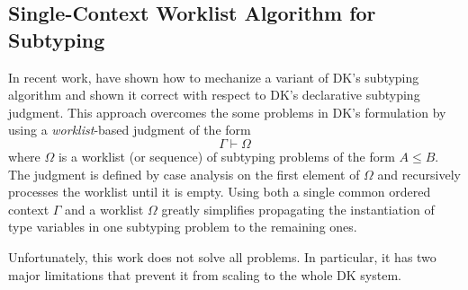 % 
% 
% 
\subsection{Single-Context Worklist Algorithm for Subtyping}

In recent work, \citet{itp2018} have shown how to mechanize a variant of DK's
subtyping algorithm and shown it correct with respect to DK's declarative
subtyping judgment. This approach overcomes the some problems in DK's formulation
by using a \emph{worklist}-based judgment of the form $$\Gamma \vdash \Omega$$
where $\Omega$ is a worklist (or sequence) of subtyping problems of the
form $A \leq B$.  The judgment is defined by case analysis on the first
element of $\Omega$ and recursively processes the worklist until it is empty.
Using both a single common ordered context $\Gamma$ and a worklist $\Omega$ greatly
simplifies propagating the instantiation of type variables in one
subtyping problem to the remaining ones.

Unfortunately, this work does not solve all problems. In particular, it has two
major limitations that prevent it from scaling to the whole DK system. 

